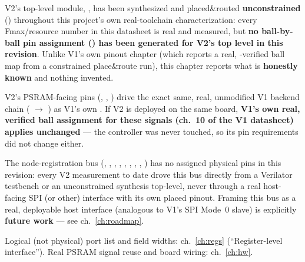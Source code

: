 \thispagestyle{plain}
\noindent
{}

\vspace{6pt}
\noindent
{\footnotesize
V2's top-level module, , has been
synthesized and placed\&routed \textbf{unconstrained}
() throughout this project's
own real-toolchain characterization: every Fmax/resource number in this
datasheet is real and measured, but \textbf{no ball-by-ball pin
assignment () has been generated for V2's top level in this
revision}. Unlike V1's own pinout chapter (which reports a real,
-verified ball map from a constrained place\&route run),
this chapter reports what is \textbf{honestly known} and nothing
invented.
}

\vspace{6pt}
\begin{fnnote}
V2's PSRAM-facing pins (, ,
) drive the exact same,
real, unmodified V1 backend chain ( $\to$
) as V1's own . If V2 is
deployed on the same board, \textbf{V1's own real, verified ball
assignment for these signals (ch.~10 of the V1 datasheet) applies
unchanged} --- the controller was never touched, so its pin requirements
did not change either.
\end{fnnote}

\begin{fnwarn}
The node-registration bus (, ,
, , ,
, , ,
) has no assigned physical pins in this revision: every
V2 measurement to date drove this bus directly from a Verilator
testbench or an unconstrained synthesis top-level, never through a real
host-facing SPI (or other) interface with its own placed pinout. Framing
this bus as a real, deployable host interface (analogous to V1's SPI
Mode~0 slave) is explicitly \textbf{future work} --- see
ch.~\ref{ch:roadmap}.
\end{fnwarn}

\vspace{4pt}
\noindent
{\footnotesize\color{fnGrey}
Logical (not physical) port list and field widths: ch.~\ref{ch:regs}
(``Register-level interface''). Real PSRAM signal reuse and board
wiring: ch.~\ref{ch:hw}.\par}
